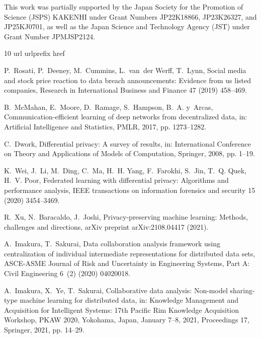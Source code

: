 \documentclass[final,3p,times]{elsarticle}
\theoremstyle{plain}
\begin{document}
This work was partially supported by the Japan Society for the Promotion of Science (JSPS) KAKENHI under Grant Numbers JP22K18866, JP23K26327, and JP25KJ0701, as well as the Japan Science and Technology Agency (JST) under Grant Number JPMJSP2124.

%  
% 

\begin{thebibliography}{10}
\expandafter\ifx\csname url\endcsname\relax
  \def\url#1{\texttt{#1}}\fi
\expandafter\ifx\csname urlprefix\endcsname\relax\def\urlprefix{URL }\fi
\expandafter\ifx\csname href\endcsname\relax
  \def\href#1#2{#2} \def\path#1{#1}\fi

P.~Rosati, P.~Deeney, M.~Cummins, L.~van~der Werff, T.~Lynn, Social media and stock price reaction to data breach announcements: Evidence from us listed companies, Research in International Business and Finance 47 (2019) 458--469.

B.~McMahan, E.~Moore, D.~Ramage, S.~Hampson, B.~A. y~Arcas, Communication-efficient learning of deep networks from decentralized data, in: Artificial Intelligence and Statistics, PMLR, 2017, pp. 1273--1282.

C.~Dwork, Differential privacy: A survey of results, in: International Conference on Theory and Applications of Models of Computation, Springer, 2008, pp. 1--19.

K.~Wei, J.~Li, M.~Ding, C.~Ma, H.~H. Yang, F.~Farokhi, S.~Jin, T.~Q. Quek, H.~V. Poor, Federated learning with differential privacy: Algorithms and performance analysis, IEEE transactions on information forensics and security 15 (2020) 3454--3469.

R.~Xu, N.~Baracaldo, J.~Joshi, Privacy-preserving machine learning: Methods, challenges and directions, arXiv preprint arXiv:2108.04417 (2021).

A.~Imakura, T.~Sakurai, Data collaboration analysis framework using centralization of individual intermediate representations for distributed data sets, ASCE-ASME Journal of Risk and Uncertainty in Engineering Systems, Part A: Civil Engineering 6~(2) (2020) 04020018.

A.~Imakura, X.~Ye, T.~Sakurai, Collaborative data analysis: Non-model sharing-type machine learning for distributed data, in: Knowledge Management and Acquisition for Intelligent Systems: 17th Pacific Rim Knowledge Acquisition Workshop, PKAW 2020, Yokohama, Japan, January 7--8, 2021, Proceedings 17, Springer, 2021, pp. 14--29.


\end{thebibliography}
\end{document}

